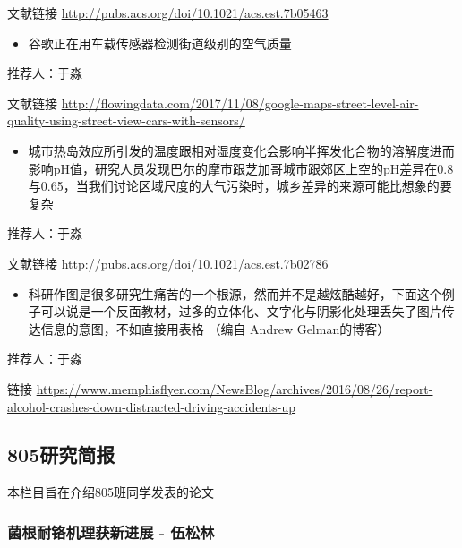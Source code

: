 \documentclass[
]{book}
\providecommand{\tightlist}{%
  \setlength{\itemsep}{0pt}\setlength{\parskip}{0pt}}
\begin{document}
文献链接 \url{http://pubs.acs.org/doi/10.1021/acs.est.7b05463}

\begin{itemize}
\tightlist
\item
  谷歌正在用车载传感器检测街道级别的空气质量
\end{itemize}

推荐人：于淼

文献链接 \url{http://flowingdata.com/2017/11/08/google-maps-street-level-air-quality-using-street-view-cars-with-sensors/}

\begin{itemize}
\tightlist
\item
  城市热岛效应所引发的温度跟相对湿度变化会影响半挥发化合物的溶解度进而影响pH值，研究人员发现巴尔的摩市跟芝加哥城市跟郊区上空的pH差异在0.8与0.65，当我们讨论区域尺度的大气污染时，城乡差异的来源可能比想象的要复杂
\end{itemize}

推荐人：于淼

文献链接 \url{http://pubs.acs.org/doi/10.1021/acs.est.7b02786}

\begin{itemize}
\tightlist
\item
  科研作图是很多研究生痛苦的一个根源，然而并不是越炫酷越好，下面这个例子可以说是一个反面教材，过多的立体化、文字化与阴影化处理丢失了图片传达信息的意图，不如直接用表格 （编自 Andrew Gelman的博客）
\end{itemize}

推荐人：于淼

链接 \url{https://www.memphisflyer.com/NewsBlog/archives/2016/08/26/report-alcohol-crashes-down-distracted-driving-accidents-up}

\hypertarget{ux7814ux7a76ux7b80ux62a5}{%
\subsection*{805研究简报}\label{ux7814ux7a76ux7b80ux62a5}}

本栏目旨在介绍805班同学发表的论文

\hypertarget{ux83ccux6839ux8010ux94ecux673aux7406ux83b7ux65b0ux8fdbux5c55---ux4f0dux677eux6797}{%
\subsubsection*{菌根耐铬机理获新进展 - 伍松林}\label{ux83ccux6839ux8010ux94ecux673aux7406ux83b7ux65b0ux8fdbux5c55---ux4f0dux677eux6797}}
\end{document}
